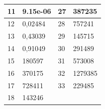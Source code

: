 \documentclass[11pt]{article}
\begin{document}
\begin{figure}[H]
\begin{minipage}{0.5\textwidth}
\begin{tabular}{|l|l|l|l|}
            11 & 9.15e-06 & 27 & 387235 \\ \hline
            12 & 0,02484 & 28 & 757241 \\ \hline
            13 & 0,43039 & 29 & 145715 \\ \hline
            14 & 0,91049 & 30 & 291489 \\ \hline
            15 & 180597 & 31 & 573008 \\ \hline
            16 & 370175 & 32 & 1279385 \\ \hline
            17 & 728411 & 33 & 229485 \\ \hline
            18 & 143246 & ~ & \\ \hline
        \end{tabular}
    \end{minipage}
\end{figure}
\end{document}
